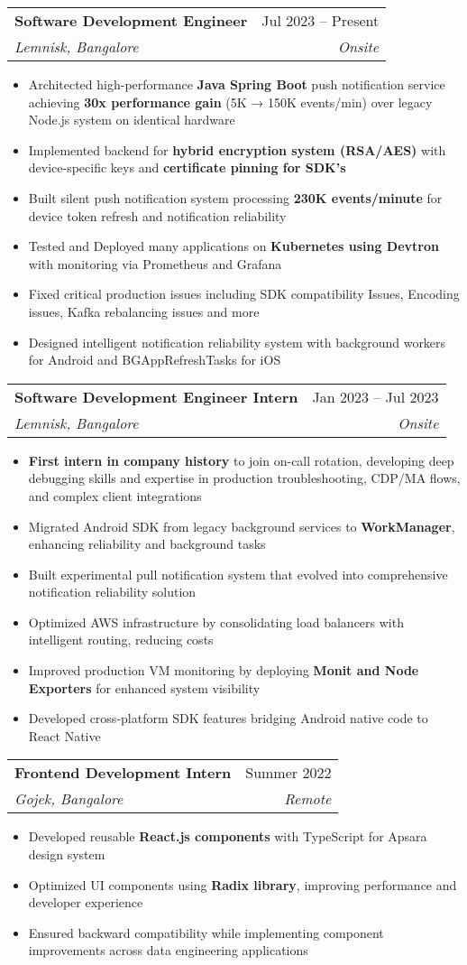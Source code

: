 \documentclass[letterpaper,10pt]{article}
\makeatletter
\newcommand{\resumeItem}[1]{
  \item\normalsize{
    {#1 \vspace{-2pt}}
  }
}
\newcommand{\resumeSubheading}[4]{
  \vspace{-1pt}\item
    \begin{tabular*}{0.97\textwidth}[t]{l@{\extracolsep{\fill}}r}
      \textbf{\normalsize #1} & #2 \\
      \textit{\small#3} & \textit{\small #4} \\
    \end{tabular*}\vspace{-5pt}
}
\newcommand{\resumeItemListStart}{\begin{itemize}[leftmargin=0.1in]}
\newcommand{\resumeItemListEnd}{\end{itemize}\vspace{-5pt}}
\makeatother
\begin{document}
    \resumeSubheading
      {Software Development Engineer}{Jul 2023 -- Present}
      {Lemnisk, Bangalore}{Onsite}
      \resumeItemListStart
        \resumeItem{Architected high-performance \textbf{Java Spring Boot} push notification service achieving \textbf{30x performance gain} (5K → 150K events/min) over legacy Node.js system on identical hardware}
        \resumeItem{Implemented backend for \textbf{hybrid encryption system (RSA/AES)} with device-specific keys and \textbf{certificate pinning for SDK's}}
        \resumeItem{Built silent push notification system processing \textbf{230K events/minute} for device token refresh and notification reliability}
        \resumeItem{Tested and Deployed many applications on \textbf{Kubernetes using Devtron} with monitoring via Prometheus and Grafana}
        \resumeItem{Fixed critical production issues including SDK compatibility Issues, Encoding issues, Kafka rebalancing issues and more}
        \resumeItem{Designed intelligent notification reliability system with background workers for Android and BGAppRefreshTasks for iOS}
      \resumeItemListEnd

    \vspace{5pt} %
    
    \resumeSubheading
      {Software Development Engineer Intern}{Jan 2023 -- Jul 2023}
      {Lemnisk, Bangalore}{Onsite}
      \resumeItemListStart
        \resumeItem{\textbf{First intern in company history} to join on-call rotation, developing deep debugging skills and expertise in production troubleshooting, CDP/MA flows, and complex client integrations}
        \resumeItem{Migrated Android SDK from legacy background services to \textbf{WorkManager}, enhancing reliability and background tasks}
        \resumeItem{Built experimental pull notification system that evolved into comprehensive notification reliability solution}
        \resumeItem{Optimized AWS infrastructure by consolidating load balancers with intelligent routing, reducing costs}
        \resumeItem{Improved production VM monitoring by deploying \textbf{Monit and Node Exporters} for enhanced system visibility}
        \resumeItem{Developed cross-platform SDK features bridging Android native code to React Native}
      \resumeItemListEnd

    \vspace{5pt} %
    
    \resumeSubheading
      {Frontend Development Intern}{Summer 2022}
      {Gojek, Bangalore}{Remote}
      \resumeItemListStart
        \resumeItem{Developed reusable \textbf{React.js components} with TypeScript for Apsara design system}
        \resumeItem{Optimized UI components using \textbf{Radix library}, improving performance and developer experience}
        \resumeItem{Ensured backward compatibility while implementing component improvements across data engineering applications}
      \resumeItemListEnd
\end{document}
